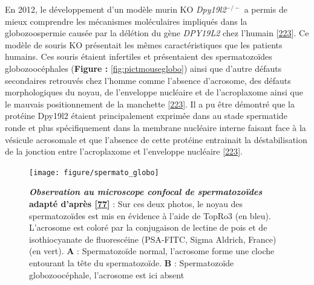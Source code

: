 \documentclass[12pt,a4paper,twoside]{ugathesis}
\theoremstyle{definition}
\theoremstyle{definition}
\theoremstyle{definition}
\theoremstyle{remark}
\begin{document}
En 2012, le développement d'un modèle murin KO \emph{Dpy19l2}\(^{-/-}\)
a permis de mieux comprendre les mécanismes moléculaires impliqués dans
la globozoospermie causée par la délétion du gène \emph{DPY19L2} chez
l'humain {[}\protect\hyperlink{ref-Pierre2012}{223}{]}. Ce modèle de
souris KO présentait les mêmes caractéristiques que les patients
humains. Ces souris étaient infertiles et présentaient des
spermatozoïdes globozoocéphales (\textbf{Figure :
}\ref{fig:pictmouseglobo}) ainsi que d'autre défauts secondaires
retrouvés chez l'homme comme l'absence d'acrosome, des défauts
morphologiques du noyau, de l'enveloppe nucléaire et de l'acroplaxome
ainsi que le mauvais positionnement de la manchette
{[}\protect\hyperlink{ref-Pierre2012}{223}{]}. Il a pu être démontré que
la protéine Dpy19l2 étaient principalement exprimée dans au stade
spermatide ronde et plus spécifiquement dans la membrane nucléaire
interne faisant face à la vésicule acrosomale et que l'absence de cette
protéine entrainait la déstabilisation de la jonction entre
l'acroplaxome et l'enveloppe nucléaire
{[}\protect\hyperlink{ref-Pierre2012}{223}{]}.

\newpage

\begin{figure}

{\centering \texttt{[image: figure/spermato\_globo]} 

}

\caption[Observation au microscope confocal de spermatozoïdes]{\textbf{\emph{Observation au microscope confocal de
spermatozoïdes} adapté d'après
{[}\protect\hyperlink{ref-Harbuz2011}{77}{]}} : Sur ces deux photos, le
noyau des spermatozoïdes est mis en évidence à l'aide de TopRo3 (en
bleu). L'acrosome est coloré par la conjugaison de lectine de pois et de
isothiocyanate de fluorescéine (PSA-FITC, Sigma Aldrich, France) (en
vert). \textbf{A} : Spermatozoïde normal, l'acrosome forme une cloche
entourant la tête du spermatozoïde. \textbf{B} : Spermatozoïde
globozoocéphale, l'acrosome est ici absent}\label{fig:pictglobospz}
\end{figure}
\end{document}
